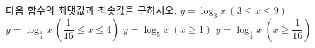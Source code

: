 다음 함수의 최댓값과 최솟값을 구하시오.
 $y=\log_3 x\ (3\le x\le 9)$
 $y=\log_{\frac{1}{4}} x\ \left(\dfrac{1}{16}\le x\le 4\right)$
 $y=\log_5 x\ (x\ge 1)$
 $y=\log_{\frac{1}{2}} x\ \left(x\ge\dfrac{1}{16}\right)$
